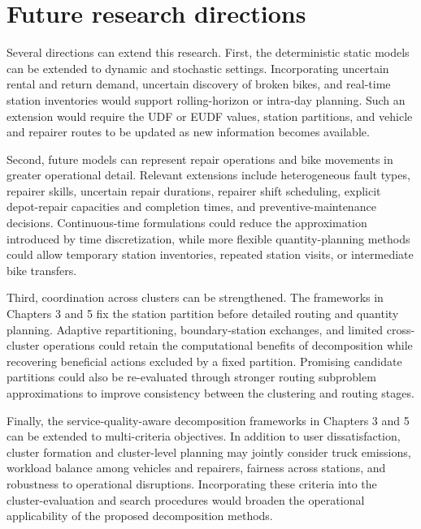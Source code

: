 \section{Future research directions}

Several directions can extend this research. First, the deterministic static models can be extended to dynamic and stochastic settings. Incorporating uncertain rental and return demand, uncertain discovery of broken bikes, and real-time station inventories would support rolling-horizon or intra-day planning. Such an extension would require the UDF or EUDF values, station partitions, and vehicle and repairer routes to be updated as new information becomes available.

Second, future models can represent repair operations and bike movements in greater operational detail. Relevant extensions include heterogeneous fault types, repairer skills, uncertain repair durations, repairer shift scheduling, explicit depot-repair capacities and completion times, and preventive-maintenance decisions. Continuous-time formulations could reduce the approximation introduced by time discretization, while more flexible quantity-planning methods could allow temporary station inventories, repeated station visits, or intermediate bike transfers.

Third, coordination across clusters can be strengthened. The frameworks in Chapters 3 and 5 fix the station partition before detailed routing and quantity planning. Adaptive repartitioning, boundary-station exchanges, and limited cross-cluster operations could retain the computational benefits of decomposition while recovering beneficial actions excluded by a fixed partition. Promising candidate partitions could also be re-evaluated through stronger routing subproblem approximations to improve consistency between the clustering and routing stages.

Finally, the service-quality-aware decomposition frameworks in Chapters 3 and 5 can be extended to multi-criteria objectives. In addition to user dissatisfaction, cluster formation and cluster-level planning may jointly consider truck emissions, workload balance among vehicles and repairers, fairness across stations, and robustness to operational disruptions. Incorporating these criteria into the cluster-evaluation and search procedures would broaden the operational applicability of the proposed decomposition methods.